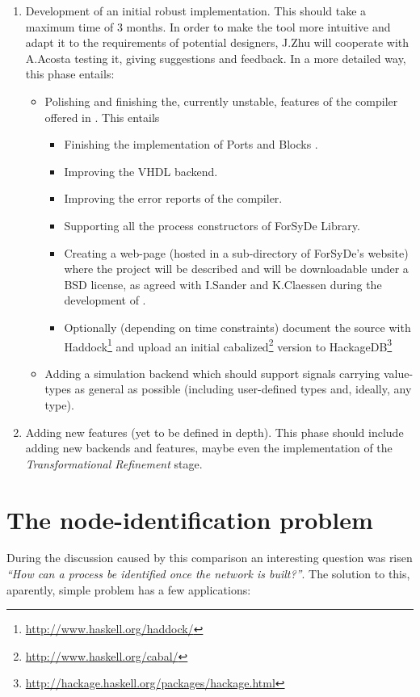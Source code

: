 \documentclass[a4paper,twoside,11pt]{article}
\begin{document}
\begin{enumerate}[1)]
\item Development of an initial robust implementation. This should take a
  maximum time of 3 months. In order to make the tool more intuitive and adapt
  it to the requirements of potential designers, J.Zhu will cooperate with
  A.Acosta testing it, giving suggestions and feedback. In a more detailed
  way, this phase entails:
  
  \begin{itemize}
  \item Polishing and finishing the, currently unstable, features of the
    compiler offered in \cite{forsyde:synthesis}. This entails
    \begin{itemize}
    \item Finishing the implementation of Ports and Blocks \cite[section
      3.7]{forsyde:synthesis}.
    \item Improving the VHDL backend.
    \item Improving the error reports of the compiler.
    \item Supporting all the process constructors of ForSyDe Library.
    \item Creating a web-page (hosted in a sub-directory of ForSyDe's website)
      where the project will be described and will be downloadable under a BSD
      license, as agreed with I.Sander and K.Claessen during the development
      of \cite{forsyde:synthesis}.
    \item Optionally (depending on time constraints) document the source with
      Haddock\footnote{\url{http://www.haskell.org/haddock/}} and upload an
      initial cabalized\footnote{\url{http://www.haskell.org/cabal/}} version
      to
      HackageDB\footnote{\url{http://hackage.haskell.org/packages/hackage.html}}
    \end{itemize}
  \item Adding a simulation backend which should support signals carrying
    value-types as general as possible (including user-defined types and,
    ideally, any type).
  \end{itemize}

\item Adding new features (yet to be defined in depth). This phase should
  include adding new backends and features, maybe even the implementation
  of the \textit{Transformational Refinement} stage.
\end{enumerate}

\section{The node-identification problem}
During the discussion caused by this comparison an interesting question was
risen \textit{``How can a process be identified once the network is built?''}.
The solution to this, aparently, simple problem has a few applications:
\end{document}
